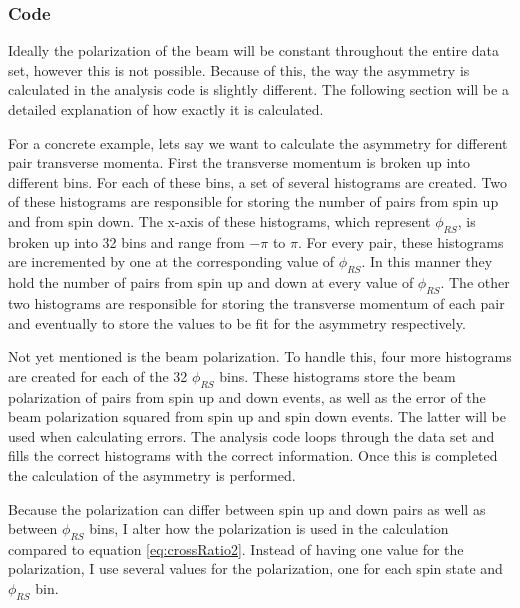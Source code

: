 \documentclass[abstract = on,listof=totoc, bibliography=totoc]{scrreprt}
\newcommand{\phirs}{\phi_{RS}}
\begin{document}
\subsubsection{Code}

Ideally the polarization of the beam will be constant throughout the entire data set, however this is not possible. Because of this, the way the asymmetry is calculated in the analysis code is slightly different. The following section will be a detailed explanation of how exactly it is calculated. 


For a concrete example, lets say we want to calculate the asymmetry for different pair transverse momenta. First the transverse momentum is broken up into different bins. For each of these bins, a set of several histograms are created. Two of these histograms are responsible for storing the number of pairs from spin up and from spin down. The x-axis of these histograms, which represent $\phirs$, is broken up into 32 bins and range from $-\pi$ to $\pi$. For every pair, these histograms are incremented by one at the corresponding value of $\phirs$. In this manner they hold the number of pairs from spin up and down at every value of $\phirs$. The other two histograms are responsible for storing the transverse momentum of each pair and eventually to store the values to be fit for the asymmetry respectively.

Not yet mentioned is the beam polarization. To handle this, four more histograms are created for each of the 32 $\phirs$ bins. These histograms store the beam polarization of pairs from spin up and down events, as well as the error of the beam polarization squared from spin up and spin down events. The latter will be used when calculating errors. The analysis code loops through the data set and fills the correct histograms with the correct information. Once this is completed the calculation of the asymmetry is performed. 

Because the polarization can differ between spin up and down pairs as well as between $\phirs$ bins, I alter how the polarization is used in the calculation compared to equation \ref{eq:crossRatio2}. Instead of having one value for the polarization, I use several values for the polarization, one for each spin state and $\phirs$ bin.    
 
\end{document}
